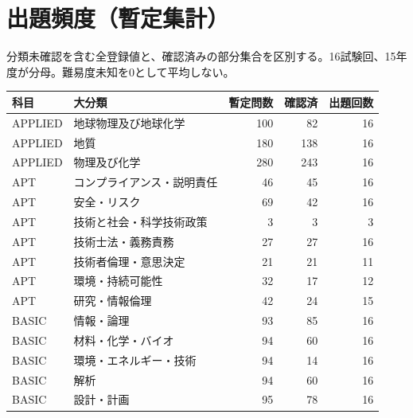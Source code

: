 \chapter{出題頻度（暫定集計）}
分類未確認を含む全登録値と、確認済みの部分集合を区別する。16試験回、15年度が分母。難易度未知を0として平均しない。
\begin{longtable}{p{.16\linewidth}p{.42\linewidth}rrr}
科目 & 大分類 & 暫定問数 & 確認済 & 出題回数\\\hline
APPLIED & 地球物理及び地球化学 & 100 & 82 & 16\\
APPLIED & 地質 & 180 & 138 & 16\\
APPLIED & 物理及び化学 & 280 & 243 & 16\\
APT & コンプライアンス・説明責任 & 46 & 45 & 16\\
APT & 安全・リスク & 69 & 42 & 16\\
APT & 技術と社会・科学技術政策 & 3 & 3 & 3\\
APT & 技術士法・義務責務 & 27 & 27 & 16\\
APT & 技術者倫理・意思決定 & 21 & 21 & 11\\
APT & 環境・持続可能性 & 32 & 17 & 12\\
APT & 研究・情報倫理 & 42 & 24 & 15\\
BASIC & 情報・論理 & 93 & 85 & 16\\
BASIC & 材料・化学・バイオ & 94 & 60 & 16\\
BASIC & 環境・エネルギー・技術 & 94 & 14 & 16\\
BASIC & 解析 & 94 & 60 & 16\\
BASIC & 設計・計画 & 95 & 78 & 16\\
\end{longtable}

